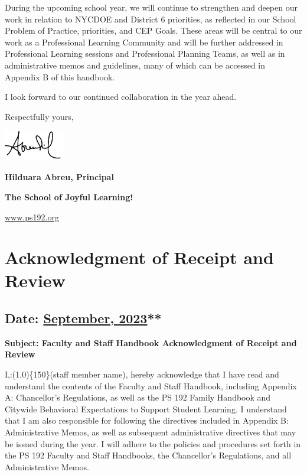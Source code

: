 \documentclass[letterpaper, 11pt]{article}
\begin{document}
During the upcoming school year, we will continue to strengthen and deepen our work in relation to NYCDOE and District 6 priorities, as reflected in our School Problem of Practice, priorities, and CEP Goals. These areas will be central to our work as a Professional Learning Community and will be further addressed in Professional Learning sessions and Professional Planning Teams, as well as in administrative memos and guidelines, many of which can be accessed in Appendix B of this handbook.

I look forward to our continued collaboration in the year ahead.

Respectfully yours,

\includegraphics[width=0.2\textwidth]{hil_signature}

\textbf{Hilduara Abreu, Principal}

\textbf{\textbf{The School of Joyful Learning!}}

\href{https://www.ps192.org}{www.ps192.org}

\pagebreak

\section{Acknowledgment of Receipt and Review}
\label{sec:org6045dda}
\subsection{Date: \href{https://www.ps192.org}{September, 2023}**}
\label{sec:org2211829}

\textbf{\textbf{Subject: Faculty and Staff Handbook Acknowledgment of Receipt and Review}}

I,:\line(1,0)\{150\}(staff member name), hereby acknowledge that I have read and understand the contents of the Faculty and Staff Handbook, including Appendix A: Chancellor’s Regulations, as well as the PS 192 Family Handbook and Citywide Behavioral Expectations to Support Student Learning. I understand that I am also responsible for following the directives included in Appendix B: Administrative Memos, as well as subsequent administrative directives that may be issued during the year. I will adhere to the policies and procedures set forth in the PS 192 Faculty and Staff Handbooks, the Chancellor’s Regulations, and all Administrative Memos.
\end{document}
